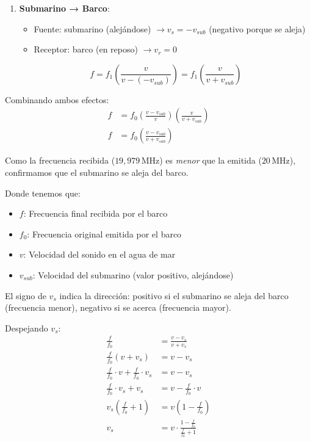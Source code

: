 \documentclass[
  11pt,
  letterpaper,
   addpoints,
   answers
  ]{exam}
\begin{document}
\begin{questions}
\begin{solution}
\begin{enumerate}
    \item \textbf{Submarino → Barco}: 
    \begin{itemize}
        \item Fuente: submarino (alejándose) $\rightarrow v_s = -v_{sub}$ (negativo porque se aleja)
        \item Receptor: barco (en reposo) $\rightarrow v_r = 0$
    \end{itemize}
    \[f = f_1 \left(\frac{v}{v - (-v_{sub})}\right) = f_1 \left(\frac{v}{v + v_{sub}}\right)\]
\end{enumerate}

Combinando ambos efectos:
\begin{align}
f &= f_0 \left(\frac{v - v_{sub}}{v}\right) \left(\frac{v}{v + v_{sub}}\right) \\
f &= f_0 \left(\frac{v - v_{sub}}{v + v_{sub}}\right)
\end{align}

Como la frecuencia recibida ($19{,}979\,\mathrm{MHz}$) es \textit{menor} que la emitida ($20\,\mathrm{MHz}$), confirmamos que el submarino se aleja del barco.

Donde tenemos que:
\begin{itemize}
    \item $f$: Frecuencia final recibida por el barco
    \item $f_0$: Frecuencia original emitida por el barco
    \item $v$: Velocidad del sonido en el agua de mar
    \item $v_{sub}$: Velocidad del submarino (valor positivo, alejándose)
\end{itemize}

El signo de $v_s$ indica la dirección: positivo si el submarino se aleja del barco (frecuencia menor), negativo si se acerca (frecuencia mayor).

Despejando $v_s$:
\begin{align}
\frac{f}{f_0} &= \frac{v - v_s}{v + v_s} \\
\frac{f}{f_0}(v + v_s) &= v - v_s \\
\frac{f}{f_0} \cdot v + \frac{f}{f_0} \cdot v_s &= v - v_s \\
\frac{f}{f_0} \cdot v_s + v_s &= v - \frac{f}{f_0} \cdot v \\
v_s\left(\frac{f}{f_0} + 1\right) &= v\left(1 - \frac{f}{f_0}\right) \\
v_s &= v \cdot \frac{1 - \frac{f}{f_0}}{\frac{f}{f_0} + 1}
\end{align}


\end{solution}
\end{questions}
\end{document}
